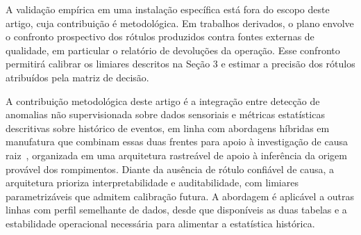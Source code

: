 \documentclass[12pt]{article}
\begin{document}
{A validação empírica em uma instalação específica está fora do escopo deste artigo, cuja contribuição é metodológica. Em trabalhos derivados, o plano envolve o confronto prospectivo dos rótulos produzidos contra fontes externas de qualidade, em particular o relatório de devoluções da operação. Esse confronto permitirá calibrar os limiares descritos na Seção 3 e estimar a precisão dos rótulos atribuídos pela matriz de decisão.}
%

{A contribuição metodológica deste artigo é a integração entre detecção de anomalias não supervisionada sobre dados sensoriais e métricas estatísticas descritivas sobre histórico de eventos, em linha com abordagens híbridas em manufatura que combinam essas duas frentes para apoio à investigação de causa raiz~\cite{9218922}, organizada em uma arquitetura rastreável de apoio à inferência da origem provável dos rompimentos. Diante da ausência de rótulo confiável de causa, a arquitetura prioriza interpretabilidade e auditabilidade, com limiares parametrizáveis que admitem calibração futura. A abordagem é aplicável a outras linhas com perfil semelhante de dados, desde que disponíveis as duas tabelas e a estabilidade operacional necessária para alimentar a estatística histórica.}
%




\end{document}
